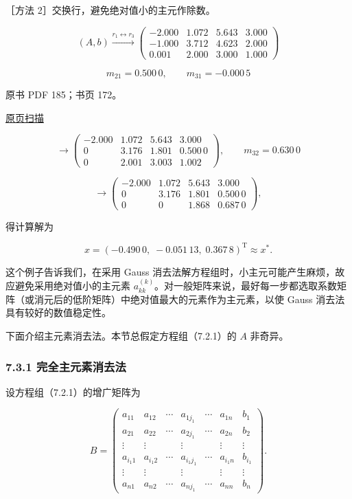 \documentclass[
  10pt,
  fontset=fandol]{ctexart}
\begin{document}
［方法 2］交换行，避免绝对值小的主元作除数。

\[
(A,b)\xrightarrow{r_1\leftrightarrow r_3}
\left(\begin{array}{rrr|r}
-2.000&1.072&5.643&3.000\\
-1.000&3.712&4.623&2.000\\
0.001&2.000&3.000&1.000
\end{array}\right)
\]

\[m_{21}=0.500\,0,\qquad m_{31}=-0.000\,5\]

\clearpage

原书 PDF 185；书页 172。

\href{../../../source-images/pdf-185.jpeg}{原页扫描}

\[
\longrightarrow\left(\begin{array}{rrr|r}
-2.000&1.072&5.643&3.000\\
0&3.176&1.801&0.500\,0\\
0&2.001&3.003&1.002
\end{array}\right),\qquad m_{32}=0.630\,0
\]

\[
\longrightarrow\left(\begin{array}{rrr|r}
-2.000&1.072&5.643&3.000\\
0&3.176&1.801&0.500\,0\\
0&0&1.868&0.687\,0
\end{array}\right),
\]

得计算解为

\[x=(-0.490\,0,\;-0.051\,13,\;0.367\,8)^{\mathrm T}\approx x^*.\]

这个例子告诉我们，在采用 Gauss 消去法解方程组时，小主元可能产生麻烦，故应避免采用绝对值小的主元素 \(a_{kk}^{(k)}\)。对一般矩阵来说，最好每一步都选取系数矩阵（或消元后的低阶矩阵）中绝对值最大的元素作为主元素，以使 Gauss 消去法具有较好的数值稳定性。

下面介绍主元素消去法。本节总假定方程组（7.2.1）的 \(A\) 非奇异。

\subsubsection{7.3.1 完全主元素消去法}\label{ux5b8cux5168ux4e3bux5143ux7d20ux6d88ux53bbux6cd5}

设方程组（7.2.1）的增广矩阵为

\[
B=\left(\begin{array}{cccccc|c}
a_{11}&a_{12}&\cdots&a_{1j_1}&\cdots&a_{1n}&b_1\\
a_{21}&a_{22}&\cdots&a_{2j_1}&\cdots&a_{2n}&b_2\\
\vdots&\vdots&&\vdots&&\vdots&\vdots\\
a_{i_1 1}&a_{i_1 2}&\cdots&a_{i_1j_1}&\cdots&a_{i_1 n}&b_{i_1}\\
\vdots&\vdots&&\vdots&&\vdots&\vdots\\
a_{n1}&a_{n2}&\cdots&a_{nj_1}&\cdots&a_{nn}&b_n
\end{array}\right).
\]
\end{document}
